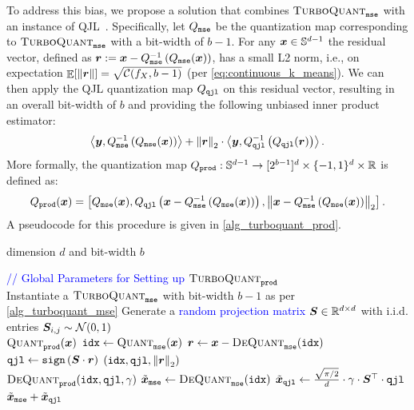 \documentclass[11pt]{article}
\newcommand{\TurboQuant}{\textsc{TurboQuant}\xspace}
\begin{document}
To address this bias, we propose a solution that combines $\TurboQuant_{\tt mse}$ with an instance of QJL~\cite{qjl}.
Specifically, let $Q_{\tt mse}$ be the quantization map corresponding to $\TurboQuant_{\tt mse}$ with a bit-width of $b-1$. 
For any ${\bm x} \in \mathbb{S}^{d-1}$ the residual vector, defined as ${\bm r} := {\bm x} - Q_{\tt mse}^{-1}\left( Q_{\tt mse}({\bm x}) \right)$, has a small L2 norm, i.e., on expectation $\mathop{{\mathbb{E}}}[\left\| {\bm r} \right\|] = \sqrt{\mathcal{C}(f_X, b-1)}$ (per \cref{eq:continuous_k_means}).
We can then apply the QJL quantization map $Q_{\tt qjl}$ on this residual vector, resulting in an overall bit-width of $b$ and providing the following unbiased inner product estimator:
\[
\left< {\bm y}, Q_{\tt mse}^{-1}\left( Q_{\tt mse}({\bm x}) \right) \right> + \left\| {\bm r} \right\|_2 \cdot \left< {\bm y}, Q_{\tt qjl}^{-1}\left( Q_{\tt qjl}({\bm r}) \right) \right>.
\]
More formally, the quantization map $Q_{\tt prod}: \mathbb{S}^{d-1} \to [2^{b-1}]^d \times \{ -1, 1 \}^d \times \mathbb{R}$ is defined as:
\[
Q_{\tt prod}({\bm x}) = \left[ Q_{\tt mse}({\bm x}), Q_{\tt qjl}\left( {\bm x} - Q_{\tt mse}^{-1}\left( Q_{\tt mse}({\bm x}) \right) \right), \left\| {\bm x} - Q_{\tt mse}^{-1}\left( Q_{\tt mse}({\bm x}) \right) \right\|_2 \right].
\]
A pseudocode for this procedure is given in \cref{alg_turboquant_prod}.

\begin{algorithm}[t!]
\caption{$\TurboQuant_{\tt prod}$: optimized for inner product}\label{alg_turboquant_prod}
\begin{algorithmic}[1]
     dimension $d$ and bit-width $b$

    {\ttfamily\textcolor{blue}{// Global Parameters for Setting up $\TurboQuant_{\tt prod}$}} \\
    \STATE Instantiate a {\ttfamily\textcolor{blue}{$\TurboQuant_{\tt mse}$}} with bit-width $b-1$ as per \cref{alg_turboquant_mse}\label{turbo_mse}
    \STATE Generate a {\ttfamily\textcolor{blue}{random projection matrix}} ${\bm S} \in \mathbb{R}^{d \times d}$ with i.i.d. entries ${\bm S}_{i,j} \sim \mathcal{N}(0, 1)$\label{random_s}
   \\\hrulefill
    $\textsc{Quant}_{\tt prod} ( {\bm x} )$
   \STATE ${\tt idx} \gets \textsc{Quant}_{\tt mse}({\bm x})$
   \STATE ${\bm r} \gets {\bm x} - \textsc{DeQuant}_{\tt mse}({\tt idx})$ \label{line_residual} \hfill \COMMENT{{\ttfamily\textcolor{blue}{ residual vector}}} 
   \STATE ${\tt qjl} \gets {\tt sign} \left( {\bm S} \cdot {\bm r} \right)$ \hfill \COMMENT{{\ttfamily\textcolor{blue}{ QJL on residual vector}}}
   $({\tt idx}, {\tt qjl}, \left\| {\bm r} \right\|_2)$
   \\\hrulefill
    $\textsc{DeQuant}_{{\tt prod}} ( {\tt idx}, {\tt qjl}, \gamma )$
   \STATE $\tilde{{\bm x}}_{\tt mse} \gets \textsc{DeQuant}_{\tt mse}({\tt idx})$ \label{line_tilde_x}
   \STATE $\tilde{{\bm x}}_{\tt qjl} \gets \frac{\sqrt{\pi/2}}{d} \cdot \gamma \cdot {\bm S}^\top \cdot {\tt qjl}$ \label{line_tilde_x_qjl}
   $\tilde{{\bm x}}_{\tt mse} + \tilde{{\bm x}}_{\tt qjl}$ \label{output_tilde_x}
\end{algorithmic}
\end{algorithm}
\end{document}
